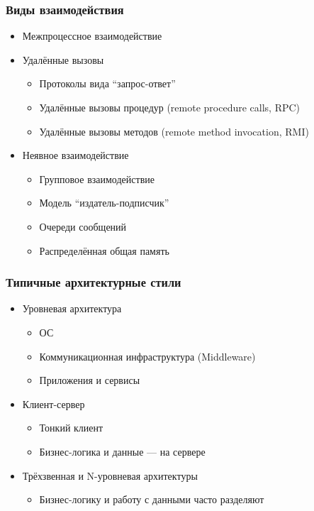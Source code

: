 \documentclass[xetex,mathserif,serif]{beamer}
\begin{document}
    \begin{frame}
        \frametitle{Виды взаимодействия}
        \begin{itemize}
            \item Межпроцессное взаимодействие
            \item Удалённые вызовы
            \begin{itemize}
                \item Протоколы вида ``запрос-ответ''
                \item Удалённые вызовы процедур (remote procedure calls, RPC)
                \item Удалённые вызовы методов (remote method invocation, RMI)
            \end{itemize}
            \item Неявное взаимодействие
            \begin{itemize}
                \item Групповое взаимодействие
                \item Модель ``издатель-подписчик''
                \item Очереди сообщений
                \item Распределённая общая память
            \end{itemize}
        \end{itemize}
    \end{frame}

    \begin{frame}
        \frametitle{Типичные архитектурные стили}
        \begin{itemize}
            \item Уровневая архитектура
            \begin{itemize}
                \item ОС
                \item Коммуникационная инфраструктура (Middleware)
                \item Приложения и сервисы
            \end{itemize}
            \item Клиент-сервер
            \begin{itemize}
                \item Тонкий клиент
                \item Бизнес-логика и данные --- на сервере
            \end{itemize}
            \item Трёхзвенная и N-уровневая архитектуры
            \begin{itemize}
                \item Бизнес-логику и работу с данными часто разделяют
            \end{itemize}
        \end{itemize}
    \end{frame}
\end{document}
